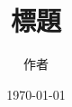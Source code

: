 \documentclass[journal]{article} %
\begin{document}
\captionsetup[figure]{name=圖}

\renewcommand{\refname}{參考文獻}

\title{標題}
\author{作者}
\date{\today}
\maketitle

\renewcommand\contentsname{目錄}
\tableofcontents



\newpage





\end{document}

